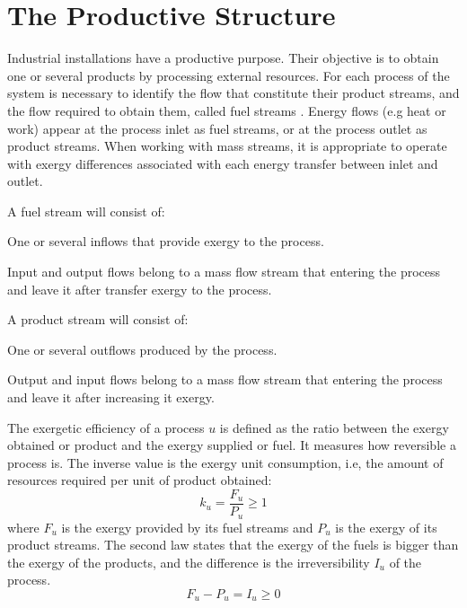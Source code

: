\documentclass{ecos}
\begin{document}
\section{The Productive Structure}
Industrial installations have a productive purpose. Their objective is to obtain one or several products by processing external resources. For each process of the system is necessary to identify the flow that constitute their product streams, and the flow  required to obtain them, called fuel streams \cite{Tsatsaronis1985,SPECO06}. Energy flows (e.g heat or work) appear at the process inlet as fuel streams, or at the process outlet as product streams. When working with mass streams, it is appropriate to operate with exergy differences associated with each energy transfer between inlet and outlet.

A fuel stream will consist of:
\begin{elist}
	\item One or several inflows that provide exergy to the process.
	\item Input and output flows belong to a mass flow stream that entering the process and leave it after transfer exergy to the process.
\end{elist}
A product stream will consist of:
\begin{elist}
	\item One or several outflows produced by the process.
	\item Output and input flows belong to a mass flow stream that entering the process and leave it after increasing it exergy.
\end{elist}

The exergetic efficiency of a process $u$ is defined as the ratio between the exergy obtained or product and the exergy supplied or fuel. It measures how reversible a process is. The inverse value is the exergy unit consumption, i.e, the amount of resources required per unit of product obtained:
\begin{equation}
k_u=\frac{F_u}{P_u} \ge 1
\end{equation}
where $F_u$ is the exergy provided by its fuel streams and $P_u$ is the exergy of its product streams. The second law states that the exergy of the fuels is bigger than the exergy of the products, and the difference is the irreversibility $I_u$ of the process.
\begin{equation}
\label{eq:fpi}
F_u - P_u = I_u \ge 0
\end{equation}
\end{document}

